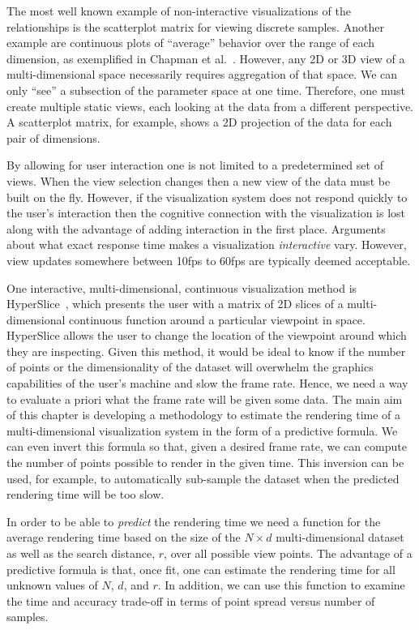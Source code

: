 The most well known example of non-interactive visualizations of the 
relationships is the scatterplot 
matrix for viewing discrete samples.
Another example are continuous plots of ``average'' behavior over the 
range of each
dimension, as exemplified in Chapman et al.~\cite{Chapman:1994}.
However, any 2D or 3D view of a multi-dimensional space necessarily requires
aggregation of that space.
We can only ``see'' a subsection of the parameter
space at one time.
Therefore, one must create multiple static views, each looking at 
the data from a different perspective.  A scatterplot matrix, for example,
shows a 2D projection of the data for each pair of dimensions.


By allowing for user interaction one is not limited to a
predetermined set of views.  
When the view selection changes then a new view of the data must be built
on the fly.
However, if the visualization system does not respond quickly to 
the user's interaction then the cognitive connection with the visualization
is lost~\cite{Shneiderman:1987} along with the advantage of adding 
interaction in the first place.
Arguments about what exact
response time makes a visualization \emph{interactive} vary.  However,
view updates somewhere between 10fps to 60fps are typically deemed acceptable.

One interactive, multi-dimensional, continuous
visualization method
is HyperSlice~\cite{Wijk:1993}, which presents the user
with a matrix of 2D slices of a multi-dimensional continuous function
around a particular viewpoint in space.
HyperSlice allows the user to change the
location of the viewpoint around which they are inspecting.
Given this method, it would be ideal to know if the number of
points or the dimensionality of the dataset will overwhelm the
graphics capabilities of the user's machine and slow the frame rate. 
Hence, we need a way to evaluate a priori what the frame rate will be
given some data. The main aim of this chapter is developing a methodology to 
estimate the rendering time of a multi-dimensional
visualization system in the form of a predictive formula.
We can even invert this formula so that, given a desired frame rate, 
we can compute the number of points 
possible to render in the given time.
This inversion can be used, for example, 
to automatically sub-sample the dataset when the predicted rendering 
time will be too slow.  

In order to be able to \emph{predict} the rendering time we need a
function for the average rendering time based on the size of the $N \times d$
multi-dimensional dataset as well as the search distance, $r$, over all possible view
points.  The advantage
of a predictive formula is that, once fit, one can estimate the rendering time
for all unknown values of $N$, $d$, and $r$.
In addition, we can use this function to examine the time and accuracy
trade-off in terms of point spread versus number of samples.

